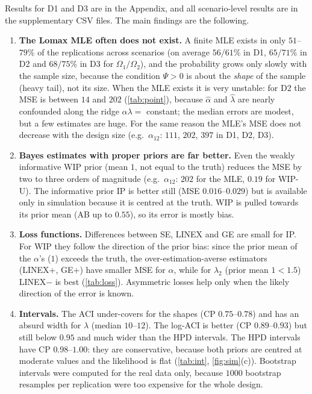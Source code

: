 \documentclass[a4paper,11pt]{article}
\begin{document}
Results for D1 and D3 are in the Appendix, and all scenario-level results are in the supplementary CSV files. The main findings are the following.
\begin{enumerate}
\item \textbf{The Lomax MLE often does not exist.} A finite MLE exists in only $51$--$79\%$ of the replications across scenarios (on average $56/61\%$ in D1, $65/71\%$ in D2 and $68/75\%$ in D3 for $\Omega_1/\Omega_2$), and the probability grows only slowly with the sample size, because the condition $\Psi>0$ is about the \emph{shape} of the sample (heavy tail), not its size. When the MLE exists it is very unstable: for D2 the MSE is between $14$ and $202$ (\cref{tab:point}), because $\hat\alpha$ and $\hat\lambda$ are nearly confounded along the ridge $\alpha\lambda=$ constant; the median errors are modest, but a few estimates are huge. For the same reason the MLE's MSE does not decrease with the design size (e.g.\ $\alpha_{12}$: $111$, $202$, $397$ in D1, D2, D3).
\item \textbf{Bayes estimates with proper priors are far better.} Even the weakly informative WIP prior (mean $1$, not equal to the truth) reduces the MSE by two to three orders of magnitude (e.g.\ $\alpha_{12}$: $202$ for the MLE, $0.19$ for WIP-U). The informative prior IP is better still (MSE $0.016$--$0.029$) but is available only in simulation because it is centred at the truth. WIP is pulled towards its prior mean (AB up to $0.55$), so its error is mostly bias.
\item \textbf{Loss functions.} Differences between SE, LINEX and GE are small for IP. For WIP they follow the direction of the prior bias: since the prior mean of the $\alpha$'s ($1$) exceeds the truth, the over-estimation-averse estimators (LINEX+, GE+) have smaller MSE for $\alpha$, while for $\lambda_2$ (prior mean $1<1.5$) LINEX$-$ is best (\cref{tab:loss}). Asymmetric losses help only when the likely direction of the error is known.
\item \textbf{Intervals.} The ACI under-covers for the shapes (CP $0.75$--$0.78$) and has an absurd width for $\lambda$ (median $10$--$12$). The log-ACI is better (CP $0.89$--$0.93$) but still below $0.95$ and much wider than the HPD intervals. The HPD intervals have CP $0.98$--$1.00$: they are conservative, because both priors are centred at moderate values and the likelihood is flat (\cref{tab:int}, \cref{fig:sim}(c)). Bootstrap intervals were computed for the real data only, because $1000$ bootstrap resamples per replication were too expensive for the whole design.

\end{enumerate}
\end{document}
